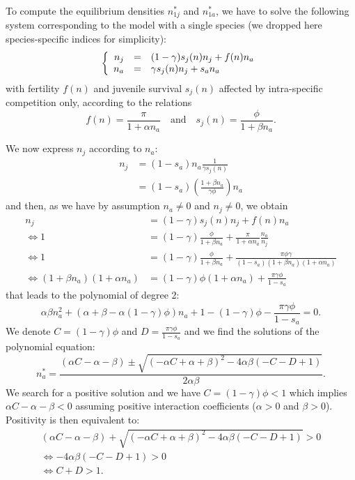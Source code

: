 \documentclass{article}
\begin{document}
To compute the equilibrium densities $n_{1j}^*$ and $n_{1a}^*$, we have to solve the following system corresponding to the model with a single species (we dropped here species-specific indices for simplicity):
\begin{equation}
    \left\{
\begin{array}{r c l}
n_j &=& (1-\gamma)s_j(n)n_j + f(n)n_a\\
n_a &=& \gamma s_j(n)n_j + s_an_a
\end{array}
\right.
\end{equation}
with fertility $f(n)$ and juvenile survival $s_j(n)$ affected by  intra-specific competition only, according to the relations
\begin{equation}
    f(n)=\frac{\pi}{1+\alpha n_a} \quad  \text{and} \quad  s_j(n) = \frac{\phi}{1+\beta n_a}.
\end{equation}

We now express $n_j$ according to $n_a$:
\begin{align}
    n_j &= (1-s_a)n_a\frac{1}{\gamma s_j(n)} \\
        &= (1-s_a)\left(\frac{1+\beta n_a}{\gamma \phi}\right)n_a
\end{align}
 and then, as we have by assumption $n_a \neq 0$ and $n_j \neq 0$, we obtain
 \begin{align*}
     n_j &= (1-\gamma)s_j(n)n_j + f(n)n_a\\
     \Leftrightarrow 1 &= (1-\gamma)\frac{\phi}{1+\beta n_a} + \frac{\pi}{1+\alpha n_a}\frac{n_a}{n_j} \\ 
     \Leftrightarrow  1 &= (1-\gamma)\frac{\phi}{1+\beta n_a} + \frac{\pi \phi \gamma}{(1-s_a)(1+\beta n_a)(1+\alpha n_a)}\\
     \Leftrightarrow (1+\beta n_a)(1+\alpha n_a) &= (1-\gamma)\phi(1+\alpha n_a) + \frac{\pi \gamma \phi}{1-s_a}
 \end{align*}
that leads to the polynomial of degree 2:
\begin{equation}
    \alpha\beta n_a^2 + (\alpha + \beta - \alpha(1-\gamma)\phi)n_a+1-(1-\gamma)\phi-\frac{\pi\gamma\phi}{1-s_a} = 0.
\end{equation}
We denote $C= (1-\gamma)\phi$ and $D= \frac{\pi\gamma\phi}{1-s_a}$ and we find the solutions of the polynomial equation:
\begin{equation}
    n_a^* = \frac{(\alpha C-\alpha-\beta) \pm \sqrt{(-\alpha C + \alpha + \beta)^2 - 4\alpha\beta(-C-D+1)}}{2\alpha\beta}.
\end{equation}
We search for a positive solution and we have $C=(1-\gamma)\phi < 1$ which implies $\alpha C - \alpha - \beta < 0$ assuming positive interaction coefficients ($\alpha>0$ and $\beta>0$). Positivity is then equivalent to:
\begin{align}
    (\alpha C-\alpha-\beta) + \sqrt{(-\alpha C + \alpha + \beta)^2 - 4\alpha\beta(-C-D+1)} > 0 \\
    \iff - 4\alpha\beta(-C-D+1) > 0 \\
    \iff C+D > 1.
\end{align}
\end{document}
